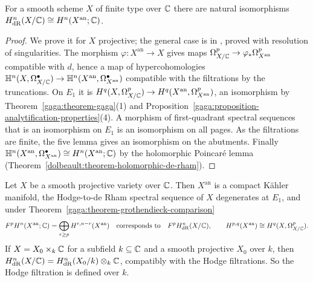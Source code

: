 \begin{theorem}[Grothendieck]\label{gaga:theorem-grothendieck-comparison}
For a smooth scheme $X$ of finite type over $\mathbb{C}$ there are natural isomorphisms $H^n_{\mathrm{dR}}(X/\mathbb{C}) \cong H^n(X^{\mathrm{an}}; \mathbb{C})$.
\end{theorem}

\begin{proof}
We prove it for $X$ projective; the general case is in \cite{grothendieck-de-rham}, proved with resolution of singularities. The morphism
$\varphi \colon X^{\mathrm{an}} \to X$ gives maps $\Omega^p_{X/\mathbb{C}} \to \varphi_*\Omega^p_{X^{\mathrm{an}}}$ compatible with $d$, hence a map of hypercohomologies
$\mathbb{H}^n(X, \Omega^\bullet_{X/\mathbb{C}}) \to \mathbb{H}^n(X^{\mathrm{an}}, \Omega^\bullet_{X^{\mathrm{an}}})$ compatible with the filtrations by the truncations. On $E_1$ it is
$H^q(X, \Omega^p_{X/\mathbb{C}}) \to H^q(X^{\mathrm{an}}, \Omega^p_{X^{\mathrm{an}}})$, an isomorphism by Theorem~\ref{gaga:theorem-gaga}(1) and
Proposition~\ref{gaga:proposition-analytification-properties}(4). A morphism of first-quadrant spectral sequences that is an isomorphism on $E_1$ is an isomorphism on
all pages. As the filtrations are finite, the five lemma gives an isomorphism on the abutments. Finally
$\mathbb{H}^n(X^{\mathrm{an}}, \Omega^\bullet_{X^{\mathrm{an}}}) \cong H^n(X^{\mathrm{an}}; \mathbb{C})$ by the holomorphic Poincar\'e lemma
(Theorem~\ref{dolbeault:theorem-holomorphic-de-rham}).
\end{proof}

\begin{corollary}\label{gaga:corollary-algebraic-hodge}
Let $X$ be a smooth projective variety over $\mathbb{C}$. Then $X^{\mathrm{an}}$ is a compact K\"ahler manifold, the Hodge-to-de Rham spectral sequence of $X$ degenerates at $E_1$,
and under Theorem~\ref{gaga:theorem-grothendieck-comparison}
\[
F^pH^n(X^{\mathrm{an}}; \mathbb{C}) = \bigoplus_{r \geq p}H^{r,n-r}(X^{\mathrm{an}}) \quad\text{corresponds to}\quad F^pH^n_{\mathrm{dR}}(X/\mathbb{C}), \qquad H^{p,q}(X^{\mathrm{an}}) \cong H^q(X, \Omega^p_{X/\mathbb{C}}).
\]
If $X = X_0 \times_k\mathbb{C}$ for a subfield $k \subseteq \mathbb{C}$ and a smooth projective $X_0$ over $k$, then $H^n_{\mathrm{dR}}(X/\mathbb{C}) = H^n_{\mathrm{dR}}(X_0/k) \otimes_k\mathbb{C}$, compatibly
with the Hodge filtrations. So the Hodge filtration is defined over $k$.
\end{corollary}

